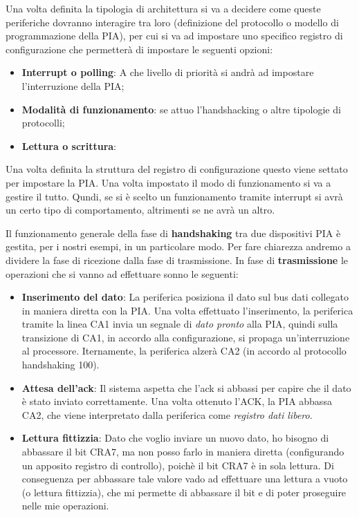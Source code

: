 Una volta definita la tipologia di architettura si va a decidere come queste periferiche dovranno interagire tra loro (definizione del protocollo o modello di programmazione della PIA), per cui si va ad impostare uno specifico registro di configurazione che permetterà di impostare le seguenti opzioni:

\begin{itemize}
    \item \textbf{Interrupt o polling}: A che livello di priorità si andrà ad impostare l'interruzione della PIA;
    \item \textbf{Modalità di funzionamento}: se attuo l'handshacking o altre tipologie di protocolli;
    \item \textbf{Lettura o scrittura}: 

 
\end{itemize}
Una volta definita la struttura del registro di configurazione questo viene settato per impostare la PIA. 
Una volta impostato il modo di funzionamento si va a gestire il tutto. Qundi, se si è scelto un funzionamento tramite interrupt si avrà un certo tipo di comportamento, altrimenti se ne avrà un altro.

Il funzionamento generale della fase di \textbf{handshaking} tra due dispositivi PIA è gestita, per i nostri esempi, in un particolare modo.
Per fare chiarezza andremo a dividere la fase di ricezione dalla fase di trasmissione.
In fase di \textbf{trasmissione} le operazioni che si vanno ad effettuare sonno le seguenti:
\begin{itemize}
    \item \textbf{Inserimento del dato}: La periferica posiziona il dato sul bus dati collegato in maniera diretta con la PIA. Una volta effettuato l'inserimento, la periferica tramite la linea CA1 invia un segnale di \textit{dato pronto} alla PIA, quindi sulla transizione di CA1, in accordo alla configurazione, si propaga un'interruzione al processore. Iternamente, la periferica alzerà CA2 (in accordo al protocollo handshaking 100).
    \item \textbf{Attesa dell'ack}: Il sistema aspetta che l'ack si abbassi per capire che il dato è stato inviato correttamente. Una volta ottenuto l'ACK, la PIA abbassa CA2, che viene interpretato dalla periferica come \textit{registro dati libero}.
    \item \textbf{Lettura fittizzia}: Dato che voglio inviare un nuovo dato, ho bisogno di abbassare il bit CRA7, ma non posso farlo in maniera diretta (configurando un apposito registro di controllo), poichè il bit CRA7 è in sola lettura. Di conseguenza per abbassare tale valore vado ad effettuare una lettura a vuoto (o lettura fittizzia), che mi permette di abbassare il bit e di poter proseguire nelle mie operazioni.
\end{itemize}

